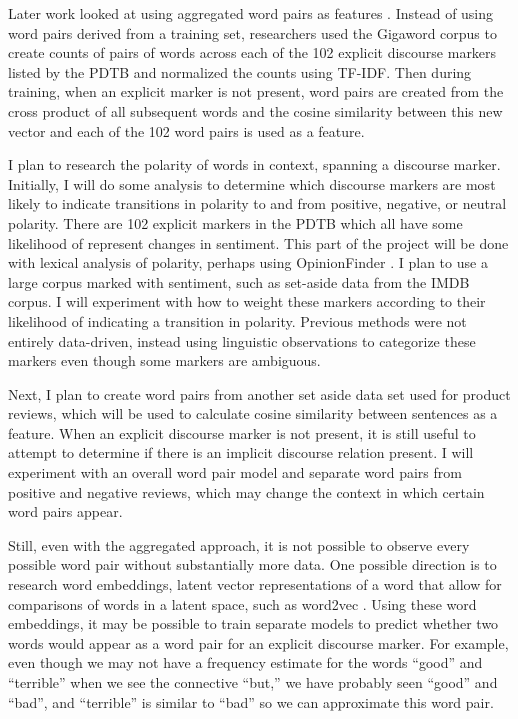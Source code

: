 \documentclass[11pt,letterpaper]{article}
\begin{document}
Later work looked at using aggregated word pairs as features \cite{Biran:2013}.  Instead of using word pairs derived from a training set, researchers used the Gigaword corpus
to create counts of pairs of words across each of the 102 explicit discourse markers listed by the PDTB and normalized the counts using TF-IDF.  Then during training, when
an explicit marker is not present, word pairs are created from the cross product of all subsequent words and the cosine similarity between this new vector and each of the 102
word pairs is used as a feature.

I plan to research the polarity of words in context, spanning a discourse marker.  Initially, I will do some analysis to determine which discourse markers are most likely
to indicate transitions in polarity to and from positive, negative, or neutral polarity.  There are 102 explicit markers in the PDTB which all have some likelihood of
represent changes in sentiment.  This part of the project will be done with lexical analysis of polarity, perhaps using OpinionFinder \cite{Wilson}.  I plan to use a large 
corpus marked with sentiment, such as set-aside data from the IMDB corpus.   I will experiment with how to weight these markers according to their likelihood of 
indicating a transition in polarity.  Previous methods were not entirely data-driven, instead using linguistic observations to categorize these markers even though some markers are ambiguous.

Next, I plan to create word pairs from another set aside data set used for product reviews, which will be used to calculate cosine similarity between sentences as a feature.  When
an explicit discourse marker is not present, it is still useful to attempt to determine if there is an implicit discourse relation present.
I will experiment with an overall word pair model and separate word pairs from positive and negative reviews, which may change the context in which certain word pairs appear.

Still, even with the aggregated approach, it is not possible to observe every possible word pair without substantially more data.  One possible direction is to research word embeddings,
latent vector representations of a word that allow for comparisons of words in a latent space, such as word2vec \cite{Mikolov}.  Using these word embeddings, it may be possible to train separate models to predict
whether two words would appear as a word pair for an explicit discourse marker.  For example, even though we may not have a frequency estimate for the words ``good'' and ``terrible''
when we see the connective ``but,'' we have probably seen ``good'' and ``bad'', and ``terrible'' is similar to ``bad'' so we can approximate this word pair.
\end{document}
